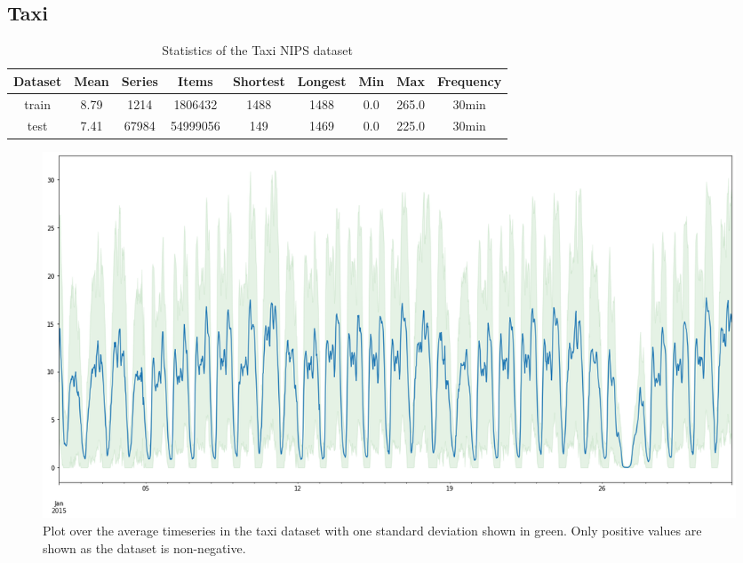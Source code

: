 \clearpage
\subsection{Taxi}
\begin{table}[htb]
    \begin{tabular}{||c | c c c c c c c c ||} 
        \hline
       Dataset & Mean & Series & Items & Shortest & Longest & Min & Max & Frequency\\ [0.5ex] 
        \hline\hline
        train & 8.79 & 1214 & 1806432 & 1488 & 1488 & 0.0 & 265.0 & 30min\\ 
        \hline
        test & 7.41 & 67984 & 54999056 & 149 & 1469 & 0.0 & 225.0 & 30min\\
        \hline
    \end{tabular}
    \caption{Statistics of the Taxi NIPS dataset}
\end{table}

\begin{figure}[htb]
    \centering
      \includegraphics[width=\linewidth]{4_designing/figures/taxi_30min_plot.png}
      \caption{Plot over the average timeseries in the taxi dataset with one standard deviation shown in green. Only positive values are shown as the dataset is non-negative.}
      \label{fig:taxi_30min_plot}
    \endminipage\hfill
\end{figure}

